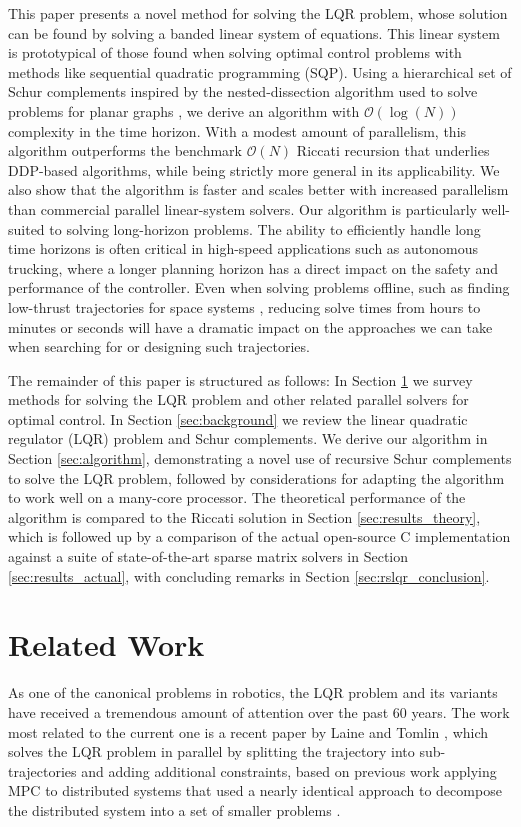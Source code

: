 \documentclass[../root.tex]{subfiles}
\newcommand{\0}{{\transparent{0} \resizebox{\mycellheight}{\mycellheight}{0}}}
\begin{document}
This paper presents a novel method for solving the LQR problem, whose solution can be found 
by solving a banded linear system of equations. This linear system is prototypical of those 
found when solving optimal control problems with methods like sequential quadratic
programming (SQP). Using a hierarchical set of Schur complements inspired by the
nested-dissection algorithm used to solve problems for planar graphs
\cite{george_Nested_1973,khaira_Nested_}, we derive an algorithm with $\mathcal{O}(\log(N))$
complexity in the time horizon. With a modest amount of parallelism, this algorithm
outperforms the benchmark $\mathcal{O}(N)$ Riccati recursion that underlies DDP-based
algorithms, while being strictly more general in its applicability. We also show that the
algorithm is faster and scales better with increased parallelism than commercial parallel
linear-system solvers. Our algorithm is particularly well-suited to solving long-horizon
problems. The ability to efficiently handle long time horizons is often critical in
high-speed applications such as autonomous trucking, where a longer planning horizon has a
direct impact on the safety and performance of the controller. Even when solving problems
offline, such as finding low-thrust trajectories for space systems
\cite{tracy_LowThrust_2021}, reducing solve times from hours to minutes or seconds will have a
dramatic impact on the approaches we can take when searching for or designing such
trajectories. 

The remainder of this paper is structured as
follows: In Section \ref{sec:related_work} we survey methods for solving the LQR problem and
other related parallel solvers for optimal control. In Section \ref{sec:background} we 
review the linear quadratic regulator (LQR) problem and Schur complements. We derive our 
algorithm in Section \ref{sec:algorithm}, demonstrating a novel use of recursive
Schur complements to solve the LQR problem, followed by considerations for adapting the 
algorithm to work well on a many-core processor. The theoretical performance of the 
algorithm is compared to the Riccati solution in Section \ref{sec:results_theory}, which is 
followed up by a comparison of the actual open-source C implementation against
a suite of state-of-the-art sparse matrix solvers in Section \ref{sec:results_actual}, with 
concluding remarks in Section \ref{sec:rslqr_conclusion}.

\section{Related Work} \label{sec:related_work}
As one of the canonical problems in robotics, the LQR problem and its variants have received
a tremendous amount of attention over the past 60 years. The work most related to the
current one is a recent paper by Laine and Tomlin \cite{laine_Parallelizing_2019}, which
solves the LQR problem in parallel by splitting the trajectory into sub-trajectories and
adding additional constraints, based on previous work applying MPC to distributed systems
that used a nearly identical approach to decompose the distributed system into a set of
smaller problems \cite{soudbakhsh_Parallelized_2013}.
\end{document}
